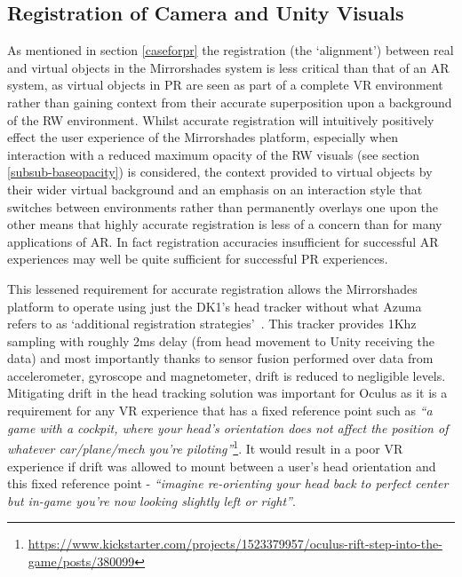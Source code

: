 
\subsection{Registration of Camera and Unity Visuals}

As mentioned in section \ref{caseforpr} the registration (the `alignment') between real and virtual objects in the Mirrorshades system is less critical than that of an AR system, as virtual objects in PR are seen as part of a complete VR environment rather than gaining context from their accurate superposition upon a background of the RW environment. Whilst accurate registration will intuitively positively effect the user experience of the Mirrorshades platform, especially when interaction with a reduced maximum opacity of the RW visuals (see section \ref{subsub-baseopacity}) is considered, the context provided to virtual objects by their wider virtual background and an emphasis on an interaction style that switches between environments rather than permanently overlays one upon the other means that highly accurate registration is less of a concern than for many applications of AR. In fact registration accuracies insufficient for successful AR experiences may well be quite sufficient for successful PR experiences.

This lessened requirement for accurate registration allows the Mirrorshades platform to operate using just the DK1's head tracker without what Azuma refers to as `additional registration strategies'~\cite{Azuma1997}. This tracker provides 1Khz sampling with roughly 2ms delay (from head movement to Unity receiving the data) and most importantly thanks to sensor fusion performed over data from accelerometer, gyroscope and magnetometer, drift is reduced to negligible levels. Mitigating drift in the head tracking solution was important for Oculus as it is a requirement for any VR experience that has a fixed reference point such as \textit{``a game with a cockpit, where your head’s orientation does not affect the position of whatever car/plane/mech you’re piloting''}\footnote{\url{https://www.kickstarter.com/projects/1523379957/oculus-rift-step-into-the-game/posts/380099}}\saveFN\rifttrackerfn. It would result in a poor VR experience if drift was allowed to mount between a user's head orientation and this fixed reference point - \textit{``imagine re-orienting your head back to perfect center but in-game you're now looking slightly left or right''}\useFN\rifttrackerfn.

